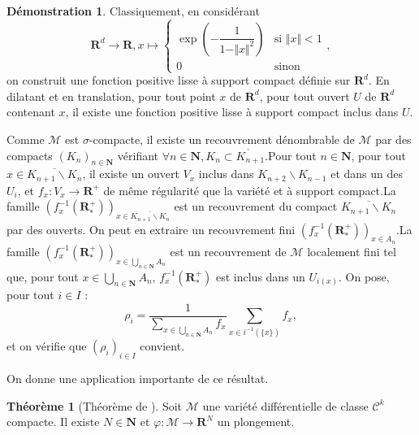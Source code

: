 \documentclass[12pt,a4paper]{article}
\theoremstyle{definition}
\newtheorem{thm}{Théorème}
\newtheorem*{dem}{Démonstration}
\begin{document}
\begin{dem}
Classiquement, en considérant
$$\mathbf{R}^d\to\mathbf{R},x\mapsto\left\{
    \begin{array}{ll}
        \exp\left(-\dfrac{1}{1-\Vert x\Vert^2}\right) & \mbox{si } \Vert x\Vert<1 \\
        0 & \mbox{sinon}
    \end{array}
\right.,$$
on construit une fonction positive lisse à support compact définie sur $\mathbf{R}^d$. En dilatant et en translation, pour tout point $x$ de $\mathbf{R}^d$, pour tout ouvert $U$ de $\mathbf{R}^d$ contenant $x$, il existe une fonction positive lisse à support compact inclus dans $U$.

\medskip

Comme $\mathcal{M}$ est $\sigma$-compacte, il existe un recouvrement dénombrable de $\mathcal{M}$ par des compacts $(K_n)_{n\in\mathbf{N}}$ vérifiant $\forall n\in\mathbf{N}, K_n\subset\mathring{K_{n+1}}$.\newline Pour tout $n\in\mathbf{N}$, pour tout $x\in\overline{K_{n+1}\backslash K_n}$, il existe un ouvert $V_x$ inclus dans $K_{n+2}\backslash K_{n-1}$ et dans un des $U_i$, et $f_x:V_x\to\mathbf{R}^+$ de même régularité que la variété et à support compact.\newline La famille $\left(f_x^{-1}(\mathbf{R}_*^+)\right)_{x\in \overline{K_{n+1}\backslash K_n}}$ est un recouvrement du compact $\overline{K_{n+1}\backslash K_n}$ par des ouverts. On peut en extraire un recouvrement fini $\left(f_x^{-1}(\mathbf{R}_*^+)\right)_{x\in A_n}$.\newline La famille $\displaystyle(f_x^{-1}(\mathbf{R}^+_*))_{x\in\bigcup\limits_{n\in\mathbf{N}}A_n}$ est un recouvrement de $\mathcal{M}$ localement fini tel que, pour tout $x\in\bigcup\limits_{n\in\mathbf{N}}A_n$, $f^{-1}_x(\mathbf{R}^+_*)$ est inclus dans un $U_{i(x)}$. On pose, pour tout $i\in I$ :
$$\rho_i=\dfrac{1}{\displaystyle\sum\limits_{x\in\bigcup\limits_{n\in\mathbf{N}}A_n}f_x}\sum\limits_{x\in i^{-1}(\{x\})}f_x,$$
et on vérifie que $(\rho_i)_{i\in I}$ convient.
\end{dem}
\newpage
On donne une application importante de ce résultat.
\begin{thm}[Théorème de ]
Soit $\mathcal{M}$ une variété différentielle de classe $\mathcal{C}^k$ compacte. Il existe $N\in\mathbf{N}$ et $\varphi:\mathcal{M}\to\mathbf{R}^N$ un plongement.
\end{thm}
\end{document}
